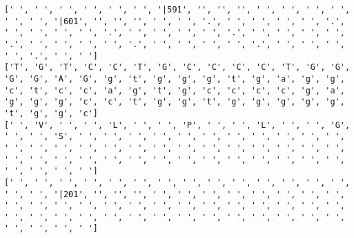 \documentclass{article}
\begin{document}
\begin{Verbatim}
[' ', ' ', ' ', ' ', ' ', ' ', '|591', '', '', '', ' ', ' ', ' ', ' ', ' ', ' ', '|601', '', '', '', ' ', ' ', '.', ' ', ' ', ' ', ' ', '.', ' ', ' ', ' ', ' ', '.', ' ', ' ', ' ', ' ', '.', ' ', ' ', ' ', ' ', '.', ' ', ' ', ' ', ' ', '.', ' ', ' ', ' ', ' ', '.', ' ', ' ', ' ', ' ', '.', ' ', ' ']
['T', 'G', 'T', 'C', 'C', 'T', 'G', 'C', 'C', 'C', 'C', 'T', 'G', 'G', 'G', 'G', 'A', 'G', 'g', 't', 'g', 'g', 'g', 't', 'g', 'a', 'g', 'g', 'c', 't', 'c', 'c', 'a', 'g', 't', 'g', 'c', 'c', 'c', 'c', 'g', 'a', 'g', 'g', 'g', 'c', 'c', 't', 'g', 'g', 't', 'g', 'g', 'g', 'g', 'g', 't', 'g', 'g', 'c']
[' ', 'V', ' ', ' ', 'L', ' ', ' ', 'P', ' ', ' ', 'L', ' ', ' ', 'G', ' ', ' ', 'S', ' ', ' ', ' ', ' ', ' ', ' ', ' ', ' ', ' ', ' ', ' ', ' ', ' ', ' ', ' ', ' ', ' ', ' ', ' ', ' ', ' ', ' ', ' ', ' ', ' ', ' ', ' ', ' ', ' ', ' ', ' ', ' ', ' ', ' ', ' ', ' ', ' ', ' ', ' ', ' ', ' ', ' ', ' ']
[' ', ' ', ' ', ' ', ' ', ' ', ' ', ' ', ' ', ' ', ' ', ' ', ' ', ' ', ' ', ' ', '|201', '', '', '', ' ', ' ', ' ', ' ', ' ', ' ', ' ', ' ', ' ', ' ', ' ', ' ', ' ', ' ', ' ', ' ', ' ', ' ', ' ', ' ', ' ', ' ', ' ', ' ', ' ', ' ', ' ', ' ', ' ', ' ', ' ', ' ', ' ', ' ', ' ', ' ', ' ', ' ', ' ', ' ']
  

\end{Verbatim}
\end{document}
